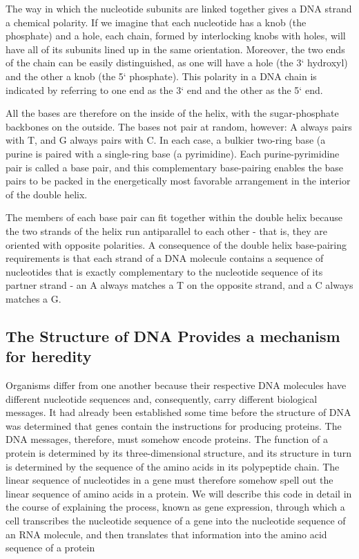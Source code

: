 The way in which the nucleotide subunits are linked together gives a
DNA strand a chemical polarity. If we imagine that each nucleotide has a
knob (the phosphate) and a hole, each chain, formed by
interlocking knobs with holes, will have all of its subunits lined up in the
same orientation. Moreover, the two ends of the chain can be easily distinguished,
as one will have a hole (the 3` hydroxyl) and the other a knob
(the 5` phosphate). This polarity in a DNA chain is indicated by referring
to one end as the 3` end and the other as the 5` end.

All the bases are therefore on the inside of the helix, with the sugar-phosphate
backbones on the outside. The bases not pair at random, however: A always pairs with T,
and G always pairs with C. In each case, a bulkier two-ring base (a purine is paired
with a single-ring base (a pyrimidine). Each purine-pyrimidine pair is called a base pair,
and this complementary base-pairing
enables the base pairs to be packed in the energetically most favorable
arrangement in the interior of the double helix.

The members of each base pair can fit together within the double helix because the two
strands of the helix run antiparallel to each other - that is, they are oriented
with opposite polarities.
A consequence of the double helix base-pairing requirements is that
each strand of a DNA molecule contains a sequence of nucleotides
that is exactly complementary to the nucleotide sequence of its partner
strand - an A always matches a T on the opposite strand, and a C
always matches a G.

\subsection{The Structure of DNA Provides a mechanism for heredity}

Organisms differ
from one another because their respective DNA molecules have different
nucleotide sequences and, consequently, carry different biological messages.
It had already been established some time before the structure of DNA
was determined that genes contain the instructions for producing proteins.
The DNA messages, therefore, must somehow encode proteins. The function of a protein is
determined by its three-dimensional structure, and its structure in turn is
determined by the sequence of the amino acids in its polypeptide chain.
The linear sequence of nucleotides in a gene must therefore somehow
spell out the linear sequence of amino acids in a protein.
We will describe this code in detail in the course of explaining
the process, known as gene expression, through which a cell transcribes
the nucleotide sequence of a gene into the nucleotide sequence of an
RNA molecule, and then translates that information into the amino acid
sequence of a protein

